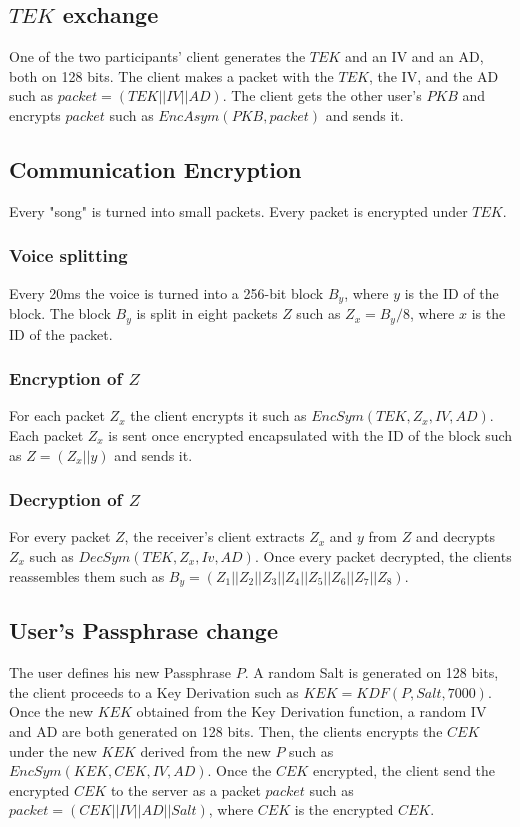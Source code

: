 \documentclass[a4paper,10pt]{article}
\begin{document}
\subsection{$TEK$ exchange}
One of the two participants' client generates the $TEK$ and an IV and an AD, both on 128 bits. The client makes a packet with the $TEK$, the IV, and the AD such as $packet=(TEK||IV||AD)$. The client gets the other user's $PKB$ and encrypts $packet$ such as $EncAsym(PKB,packet)$ and sends it.

\subsection{Communication Encryption}
Every "song" is turned into small packets. Every packet is encrypted under $TEK$.

\subsubsection{Voice splitting}
Every 20ms the voice is turned into a 256-bit block $B_y$, where $y$ is the ID of the block. The block $B_y$ is split in eight packets $Z$ such as $Z_x=B_y/8$, where $x$ is the ID of the packet. 

\subsubsection{Encryption of $Z$}
For each packet $Z_x$ the client encrypts it such as $EncSym(TEK,Z_x,IV,AD)$. Each packet $Z_x$ is sent once encrypted encapsulated with the ID of the block such as $Z=(Z_x||y)$ and sends it.

\subsubsection{Decryption of $Z$}
For every packet $Z$, the receiver's client extracts $Z_x$ and $y$ from $Z$ and decrypts $Z_x$ such as $DecSym(TEK,Z_x,Iv,AD)$. Once every packet decrypted, the clients reassembles them such as $B_y=(Z_1||Z_2||Z_3||Z_4||Z_5||Z_6||Z_7||Z_8)$.

\subsection{User's Passphrase change}
The user defines his new Passphrase $P$. A random Salt is generated on 128 bits, the client proceeds to a Key Derivation such as $KEK=KDF(P, Salt, 7000)$. Once the new $KEK$ obtained from the Key Derivation function, a random IV and AD are both generated on 128 bits. Then, the clients encrypts the $CEK$ under the new $KEK$ derived from the new $P$ such as $EncSym(KEK,CEK,IV,AD)$. Once the $CEK$ encrypted, the client send the encrypted $CEK$ to the server as a packet $packet$ such as $packet=(CEK||IV||AD||Salt)$, where $CEK$ is the encrypted $CEK$.
 
\end{document}
